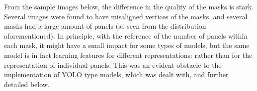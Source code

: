 \documentclass[conference]{IEEEtran}
\begin{document}


From the sample images below, the difference in the quality of the masks is stark. Several images were found to have misaligned vertices of the masks, and several masks had a large amount of panels (as seen from the distribution aforementioned). In principle, with the reference of the number of panels within each mask, it might have a small impact for some types of models, but the same model is in fact learning features for different representations: rather than for the representation of individual panels. This was an evident obstacle to the implementation of YOLO type models, which was dealt with, and further detailed below.
\end{document}
